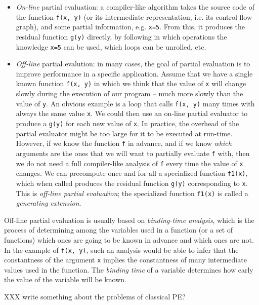 \begin{itemize}
\item \emph{On-line} partial evaluation: a compiler-like algorithm takes the
source code of the function \texttt{f(x, y)} (or its intermediate representation,
i.e. its control flow graph), and some partial
information, e.g. \texttt{x=5}.  From this, it produces the residual function
\texttt{g(y)} directly, by following in which operations the knowledge \texttt{x=5} can
be used, which loops can be unrolled, etc.

\item \emph{Off-line} partial evalution: in many cases, the goal of partial
evaluation is to improve performance in a specific application.  Assume that we
have a single known function \texttt{f(x, y)} in which we think that the value
of \texttt{x} will change slowly during the execution of our program – much
more slowly than the value of \texttt{y}.  An obvious example is a loop that
calls \texttt{f(x, y)} many times with always the same value \texttt{x}.  We
could then use an on-line partial evaluator to produce a \texttt{g(y)} for each
new value of \texttt{x}.  In practice, the overhead of the partial evaluator
might be too large for it to be executed at run-time.  However, if we know the
function \texttt{f} in advance, and if we know \emph{which} arguments are the
ones that we will want to partially evaluate \texttt{f} with, then we do not
need a full compiler-like analysis of \texttt{f} every time the value of
\texttt{x} changes.  We can precompute once and for all a specialized function
\texttt{f1(x)}, which when called produces the residual function \texttt{g(y)}
corresponding to \texttt{x}.  This is \emph{off-line partial evaluation}; the
specialized function \texttt{f1(x)} is called a \emph{generating extension}.
\end{itemize}

Off-line partial evaluation is usually based on \emph{binding-time analysis}, which
is the process of determining among the variables used in a function (or
a set of functions) which ones are going to be known in advance and
which ones are not.  In the example of \texttt{f(x, y)}, such an analysis
would be able to infer that the constantness of the argument \texttt{x}
implies the constantness of many intermediate values used in the
function.  The \emph{binding time} of a variable determines how early the
value of the variable will be known.

XXX write something about the problems of classical PE?

